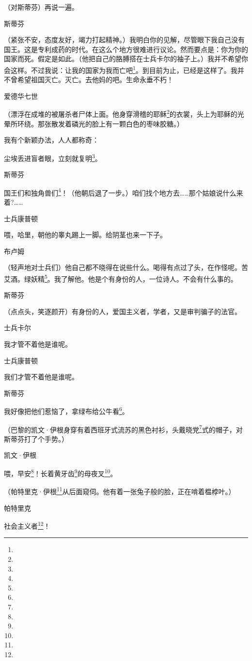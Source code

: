 \par （对斯蒂芬）再说一遍。
\par 斯蒂芬
\par （紧张不安，态度友好，竭力打起精神。）我明白你的见解，尽管眼下我自己没有国王。这是专利成药的时代。在这么个地方很难进行议论。然而要点是：你为你的国家而死。假定是如此。（他把自己的胳膊搭在士兵卡尔的袖子上。）我并不希望你会这样。不过我说：让我的国家为我而亡吧\footnote{}。到目前为止，已经是这样了。我并不曾希望祖国灭亡。灭亡。去他妈的吧。生命永垂不朽！
\par 爱德华七世
\par （漂浮在成堆的被屠杀者尸体上面。他身穿滑稽的耶稣\footnote{}的衣裳，头上为耶稣的光晕所环绕。那张散发着磷光的脸上有一颗白色的枣味胶糖。）
\par 我有个新颖办法，人人都称奇：
\par 尘埃丢进盲者眼，立刻就复明\footnote{}。
\par 斯蒂芬
\par 国王们和独角兽们\footnote{}！（他朝后退了一步。）咱们找个地方去……那个姑娘说什么来着?……
\par 士兵康普顿
\par 喂，哈里，朝他的睾丸踢上一脚。给阴茎也来一下子。
\par 布卢姆
\par （轻声地对士兵们）他自己都不晓得在说些什么。喝得有点过了头，在作怪呢。苦艾酒。绿妖精\footnote{}。我了解他。他是个有身份的人，一位诗人。不会有什么事的。
\par 斯蒂芬
\par （点点头，笑逐颜开）有身份的人，爱国主义者，学者，又是审判骗子的法官。
\par 士兵卡尔
\par 我才管不着他是谁呢。
\par 士兵康普顿
\par 我们才管不着他是谁呢。
\par 斯蒂芬
\par 我好像把他们惹恼了，拿绿布给公牛看\footnote{}。
\par （巴黎的凯文·伊根身穿有着西班牙式流苏的黑色衬衫，头戴晓党\footnote{}式的帽子，对斯蒂芬打了个手势。）
\par 凯文·伊根
\par 喂，早安\footnote{}！长着黄牙齿\footnote{}的母夜叉\footnote{}。
\par （帕特里克·伊根\footnote{}从后面窥伺。他有着一张兔子般的脸，正在啃着榅桲叶。）
\par 帕特里克
\par 社会主义者\footnote{}！
